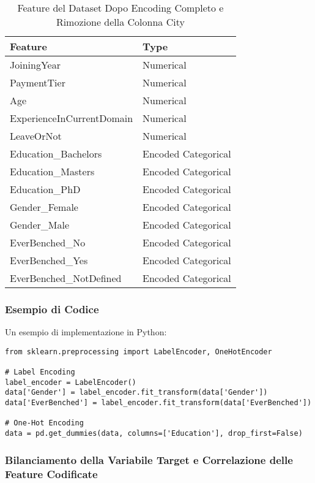 \documentclass[a4paper,12pt]{article}
\begin{document}
\begin{table}[H]
\centering
\begin{tabular}{ll}
\toprule
\textbf{Feature} & \textbf{Type} \\
\midrule
JoiningYear & Numerical \\
PaymentTier & Numerical \\
Age & Numerical \\
ExperienceInCurrentDomain & Numerical \\
LeaveOrNot & Numerical \\
Education\_Bachelors & Encoded Categorical \\
Education\_Masters & Encoded Categorical \\
Education\_PhD & Encoded Categorical \\
Gender\_Female & Encoded Categorical \\
Gender\_Male & Encoded Categorical \\
EverBenched\_No & Encoded Categorical \\
EverBenched\_Yes & Encoded Categorical \\
EverBenched\_NotDefined & Encoded Categorical \\
\bottomrule
\end{tabular}
\caption{Feature del Dataset Dopo Encoding Completo e Rimozione della Colonna City}
\label{tab:feature_summary_full}
\end{table}



\subsubsection{Esempio di Codice}
Un esempio di implementazione in Python:
\begin{verbatim}
from sklearn.preprocessing import LabelEncoder, OneHotEncoder

# Label Encoding
label_encoder = LabelEncoder()
data['Gender'] = label_encoder.fit_transform(data['Gender'])
data['EverBenched'] = label_encoder.fit_transform(data['EverBenched'])

# One-Hot Encoding
data = pd.get_dummies(data, columns=['Education'], drop_first=False)
\end{verbatim}

\subsubsection{Bilanciamento della Variabile Target e Correlazione delle Feature Codificate}
\end{document}
